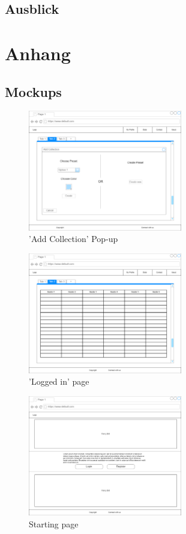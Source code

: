 \documentclass[a4paper, 12pt]{article}
\begin{document}
    \subsection{Ausblick}

    \newpage

    \appendix

    \section{Anhang}
    
    \subsection{Mockups}

    \begin{figure}[htbp]
        \centering
        \includegraphics[width=0.6\textwidth]{add_collection_pop_up}
        \caption{'Add Collection' Pop-up}
    \end{figure}    
        
    \begin{figure}[htbp]
        \centering
        \includegraphics[width=0.6\textwidth]{loggedIn_starting_site}
        \caption{'Logged in' page}
    \end{figure}

    \begin{figure}[htbp]
        \centering
        \includegraphics[width=0.6\textwidth]{Starting_site}
        \caption{Starting page}
    \end{figure}
\end{document}

